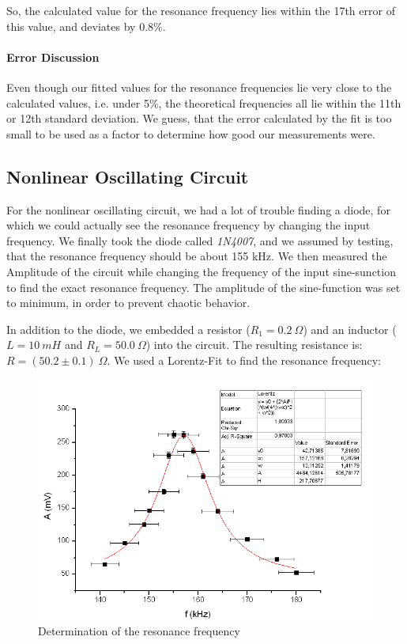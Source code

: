 So, the calculated value for the resonance frequency lies within the 17th error of this value, and deviates by 0.8\%.

\paragraph{Error Discussion}

Even though our fitted values for the resonance frequencies lie very close to the calculated values, i.e. under 5\%, the theoretical frequencies all lie within the 11th or 12th standard deviation. We guess, that the error calculated by the fit is too small to be used as a factor to determine how good our measurements were. 

\subsection{Nonlinear Oscillating Circuit}

For the nonlinear oscillating circuit, we had a lot of trouble finding a diode, for which we could actually see the resonance frequency by changing the input frequency. We finally took the diode called \emph{1N4007}, and we assumed by testing, that the resonance frequency should be about 155 kHz. We then measured the Amplitude of the circuit while changing the frequency of the input sine-sunction to find the exact resonance frequency. The amplitude of the sine-function was set to minimum, in order to prevent chaotic behavior.

In addition to the diode, we embedded a resistor ($R_1= 0.2 \ \Omega$) and an inductor ($L=10\ mH$ and $R_L = 50.0\ \Omega$) into the circuit. The resulting resistance is: $R = (50.2 \pm 0.1)\ \Omega$. We used a Lorentz-Fit to find the resonance frequency:

\begin{figure}[H]
\centering \includegraphics[width=\textwidth]{Bilder/fresnl.png}
\caption{Determination of the resonance frequency}
\end{figure}

